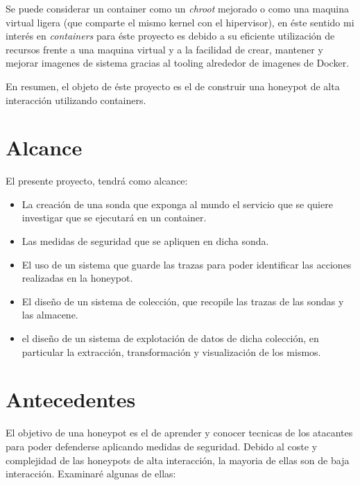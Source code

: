 Se puede considerar un container como un \emph{chroot} mejorado o como una maquina virtual ligera (que comparte el mismo kernel con el hipervisor), en éste sentido
mi interés en \emph{containers} para éste proyecto es debido a su eficiente utilización de recursos frente a una maquina virtual y a la facilidad
de crear, mantener y mejorar imagenes de sistema gracias al tooling alrededor de imagenes de Docker.

En resumen, el objeto de éste proyecto es el de construir una honeypot de alta interacción utilizando containers.

\section{Alcance}

El presente proyecto, tendrá como alcance:
\begin{itemize}
    \item La creación de una sonda que exponga al mundo el servicio que se quiere investigar que se ejecutará en un container.
    \item Las medidas de seguridad que se apliquen en dicha sonda.
    \item El uso de un sistema que guarde las trazas para poder identificar las acciones realizadas en la honeypot.
    \item El diseño de un sistema de colección, que recopile las trazas de las sondas y las almacene.
    \item el diseño de un sistema de explotación de datos de dicha colección, en particular la extracción, transformación y visualización de los mismos.
\end{itemize}

\section{Antecedentes}


El objetivo de una honeypot es el de aprender y conocer tecnicas de los atacantes para poder defenderse aplicando medidas de seguridad.
Debido al coste y complejidad de las honeypots de alta interacción, la mayoria de ellas son de baja interacción. Examinaré algunas de ellas:


